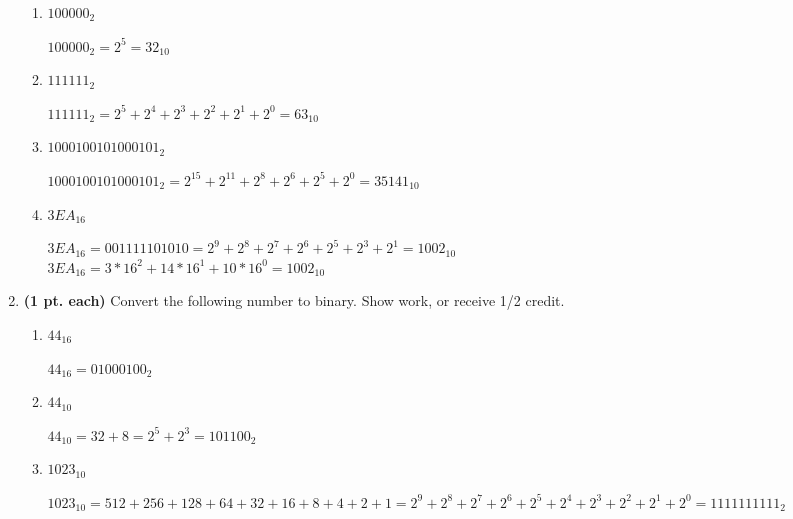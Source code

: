 \begin{enumerate}
\begin{enumerate}
            \item $100000_2$
                \begin{onlysolution}    \itshape $100000_2 = 2^5 = 32_{10}$
                \end{onlysolution}

            \item $111111_2$
                \begin{onlysolution}    \itshape $111111_2 = 2^5+2^4+2^3+2^2+2^1+2^0=63_{10}$
                \end{onlysolution}

            \item $1000100101000101_2$
                \begin{onlysolution}    \itshape $1000100101000101_2=2^{15}+2^{11}+2^8+2^6+2^5+2^0=35141_{10}$
                \end{onlysolution}

            \item $3EA_{16}$
                \begin{onlysolution}    \itshape$3EA_{16}=0011 1110 1010 =
                    2^9+2^8+2^7+2^6+2^5+2^3+2^1=1002_{10}$\\ {\color{blue} $3EA_{16} = 3*16^2 +14*16^1 + 10 *
                    16^0 = 1002_{10} $}
                \end{onlysolution}

        \end{enumerate}

    \item \textbf{ (1 pt. each)} Convert the following number to binary. Show
        work, or receive 1/2 credit.
        \begin{enumerate}
            \item $44_{16}$
                \begin{onlysolution}    \itshape $44_{16} =0100 0100_2$
                \end{onlysolution}

            \item $44_{10}$
                \begin{onlysolution}    \itshape $44_{10} = 32+8 = 2^5+2^3=101100_2$
                \end{onlysolution}

            \item $1023_{10}$
                \begin{onlysolution}    \itshape$1023_{10} = 512+256+128+64+32+16+8+4+2+1=
                    2^9+2^8+2^7+2^6+2^5+2^4+2^3+2^2+2^1+2^0=1111111111_2$
                \end{onlysolution}


\end{enumerate}
\end{enumerate}
